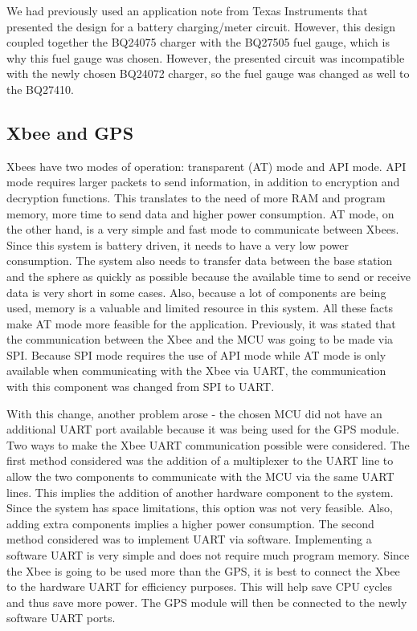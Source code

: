 We had previously used an application note \cite{batMeterAppNote} from Texas Instruments that presented the design for a battery charging/meter circuit.  However, this design coupled together the BQ24075 charger with the BQ27505 fuel gauge, which is why this fuel gauge was chosen.  However, the presented circuit was incompatible with the newly chosen BQ24072 charger, so the fuel gauge was changed as well to the BQ27410.


\subsection{Xbee and GPS}

Xbees have two modes of operation: transparent (AT) mode and API mode. API mode requires larger packets to send information, in addition to encryption and decryption functions.  This translates to the need of more RAM and program memory, more time to send data and higher power consumption.  AT mode, on the other hand, is a very simple and fast mode to communicate between Xbees. Since this system is battery driven, it needs to have a very low power consumption.  The system also needs to transfer data between the base station and the sphere as quickly as possible because the available time to send or receive data is very short in some cases.  Also, because a lot of components are being used, memory is a valuable and limited resource in this system. All these facts make AT mode more feasible for the application. Previously, it was stated that the communication between the Xbee and the MCU was going to be made via SPI. Because SPI mode requires the use of API mode while AT mode is only available when communicating with the Xbee via UART, the communication with this component was changed from SPI to UART.

With this change, another problem arose - the chosen MCU did not have an additional UART port available because it was being used for the GPS module. Two ways to make the Xbee UART communication possible were considered.  The first method considered was the addition of a multiplexer to the UART line to allow the two components to communicate with the MCU via the same UART lines.  This implies the addition of another hardware component to the system.  Since the system has space limitations, this option was not very feasible.  Also, adding extra components implies a higher power consumption.  The second method considered was to implement UART via software.  Implementing a software UART is very simple and does not require much program memory. Since the Xbee is going to be used more than the GPS, it is best to connect the Xbee to the hardware UART for efficiency purposes.  This will help save CPU cycles and thus save more power.  The GPS module will then be connected to the newly software UART ports.

